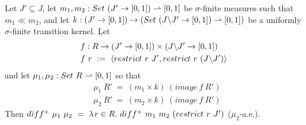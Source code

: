 \begin{corollary}
Let $J' \subseteq J$, let $m_1,m_2 : Set~(J' \to [0,1]) \rightharpoonup [0,1]$ be $\sigma$-finite measures such that $m_1 \ll m_2$, and let $k : (J' \to [0,1]) \to (Set~(J \backslash J' \to [0,1]) \rightharpoonup [0,1])$ be a uniformly $\sigma$-finite transition kernel.
Let
\begin{equation}
\begin{aligned}
	&f : R \to (J' \to [0,1]) \times (J \backslash J' \to [0,1]) \\
	&f~r\ :=\ \langle{restrict~r~J',restrict~r~(J \backslash J')}\rangle
\end{aligned}
\end{equation}
and let $\mu_1,\mu_2 : Set~R \rightharpoonup [0,1]$ so that
\begin{equation}
\begin{aligned}
	&\mu_1~R'\ =\ (m_1 \times k)~(image~f~R') \\
	&\mu_2~R'\ =\ (m_2 \times k)~(image~f~R')
\end{aligned}
\end{equation}
Then $diff^+~\mu_1~\mu_2\ =\ \lambda\mspace{2mu}{r \in R}\ldotp\, diff^+~m_1~m_2~(restrict~r~J')$ ($\mu_2$-a.e.).
\end{corollary}


